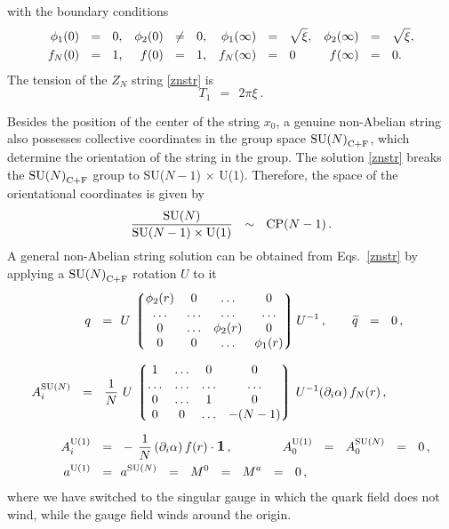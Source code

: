 \documentclass[12pt]{article}
\def\beq{\begin{equation}}
\def\eeq{\end{equation}}
\newcommand{\p}{\partial}
\newcommand{\wt}{\widetilde}
\newcommand{\lgr}{\left\lgroup}
\newcommand{\rgr}{\right\rgroup}
\def\cfl {$\text{SU($N$)}_{\rm C+F}$ }
\def\cfln {$\text{SU($N$)}_{\rm C+F}$}
\newcommand{\aU}{a^{\rm U(1)}}
\newcommand{\aN}{a^\text{SU($N$)}}
\begin{document}
	with the boundary conditions
\begin{align}
%
\label{boundary}
	\phi_1(0) & ~~=~~  0\text,                   & \phi_2(0) & ~~\neq~~ 0\text,  &
	\phi_1(\infty) & ~~=~~ \sqrt{\xi} \text,     & \phi_2(\infty) & ~~=~~ \sqrt{\xi}\text, \\
%
\notag
	f_{N}(0) & ~~=~~ 1\text,                   & f(0) & ~~=~~ 1\text,   &
	f_{N}(\infty) & ~~=~~ 0 \text\,            &  f(\infty) & ~~=~~ 0\text.
\end{align}
	The tension of the $ Z_N $ string \eqref{znstr} is 
\[
	T_1  ~~=~~ 2\pi\xi~.
\]
	
	Besides the position of the center of the string $ x_0 $, a genuine non-Abelian string 
	also possesses collective coordinates in the group space \cfln, which determine the orientation 
	of the string in the group.	
	The solution \eqref{znstr} breaks the \cfl group to SU($N-1$) $\times$ U(1).
	Therefore, the space of the orientational coordinates is given by 
\beq
\label{modulispace}
	\frac{\text{SU($N$)}}
            {\text{SU($N-1$)} \times {\rm U(1)}}         ~~\sim~~  \text{CP($N-1$)}\,.
\eeq
	A general non-Abelian string solution can be obtained from Eqs.~\eqref{znstr} by applying
	a \cfl rotation $ U $ to it
\begin{align}
%
\notag
	q ~~=~~ & U\, \lgr \begin{matrix}
			   	\phi_2(r)  & 0  & \ldots & 0 \\
				\ldots  &  \ldots & \ldots & \ldots \\
				0  & \ldots      & \phi_2(r) &  0 \\
				0  & 0           & \ldots  &  \phi_1(r) 
			   \end{matrix}        \rgr     
			U^{-1} \,,
		\qquad \wt{q} ~~=~~ 0\,,
		\\[2mm]
%
\label{nastr}
%
	A_i^\text{SU($N$)} ~~=~~ \frac{1}{N}\, &\, U\, \lgr \begin{matrix}
					          	1  & \ldots & 0 & 0 \\
						  	\ldots & \ldots & \ldots & \ldots \\
							0  & \ldots  & 1  &  0 \\
							0  & 0   & \ldots  &  - (N-1) 
					         \end{matrix} \rgr  \, U^{-1} (\p_i \alpha)\, f_{N}(r)\,,  \\[2mm]
%
\notag
	A_i^{\rm U(1)} ~~=~~ & -\,\frac{1}{N}\, (\p_i \alpha)\, f(r) \cdot \mathlarger{\mathbf{1}}\,,
	\qquad\qquad
			A_0^{\rm U(1)} ~~=~~ A_0^\text{SU($N$)} ~~=~~ 0\,,
	\\
%
\notag
	\aU ~~=~~ & \aN ~~=~~ M^0 ~~=~~ M^a ~~=~~ 0\,,
\end{align}
	where we have switched to the singular gauge in which the quark field does not wind, while the
	gauge field winds around the origin.
\end{document}
